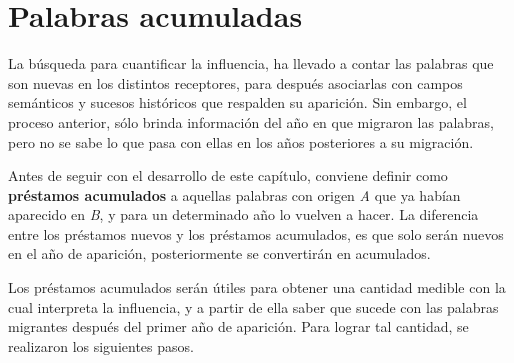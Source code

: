 \chapter{Palabras acumuladas}

La búsqueda para cuantificar la influencia, ha llevado a contar las
palabras que son nuevas en los distintos receptores, para después asociarlas con  campos semánticos y sucesos históricos que respalden su aparición. Sin embargo, el proceso anterior, sólo brinda información del año en que migraron las palabras, pero no se sabe lo que pasa con ellas en los años posteriores a su migración. 

Antes de seguir con el desarrollo de este capítulo, conviene definir como \textbf{préstamos acumulados} a aquellas palabras con origen \textit{A} que ya habían aparecido en \textit{B}, y para un determinado año lo vuelven a hacer.  La diferencia entre los préstamos nuevos y los préstamos acumulados, es que solo serán nuevos en el año de aparición, posteriormente se convertirán en acumulados.

Los préstamos acumulados serán útiles para obtener una cantidad medible con la cual interpreta la influencia, y a partir de ella saber que sucede con las palabras migrantes después del primer año de aparición.  Para lograr tal cantidad, se realizaron los siguientes pasos.



